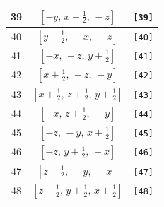 \documentclass[fleqn,8pt]{jsarticle}
\begin{document}
\begin{longtable}{ccc}
39 & $\left[ - y,\, x + \frac{1}{2},\, - z \right]$ & {\tt [39]} \\ \hline
40 & $\left[ y + \frac{1}{2},\, - x,\, - z \right]$ & {\tt [40]} \\ \hline
41 & $\left[ - x,\, - z,\, y + \frac{1}{2} \right]$ & {\tt [41]} \\ \hline
42 & $\left[ x + \frac{1}{2},\, - z,\, - y \right]$ & {\tt [42]} \\ \hline
43 & $\left[ x + \frac{1}{2},\, z + \frac{1}{2},\, y + \frac{1}{2} \right]$ & {\tt [43]} \\ \hline
44 & $\left[ - x,\, z + \frac{1}{2},\, - y \right]$ & {\tt [44]} \\ \hline
45 & $\left[ - z,\, - y,\, x + \frac{1}{2} \right]$ & {\tt [45]} \\ \hline
46 & $\left[ - z,\, y + \frac{1}{2},\, - x \right]$ & {\tt [46]} \\ \hline
47 & $\left[ z + \frac{1}{2},\, - y,\, - x \right]$ & {\tt [47]} \\ \hline
48 & $\left[ z + \frac{1}{2},\, y + \frac{1}{2},\, x + \frac{1}{2} \right]$ & {\tt [48]} \\
\end{longtable}
\end{document}
